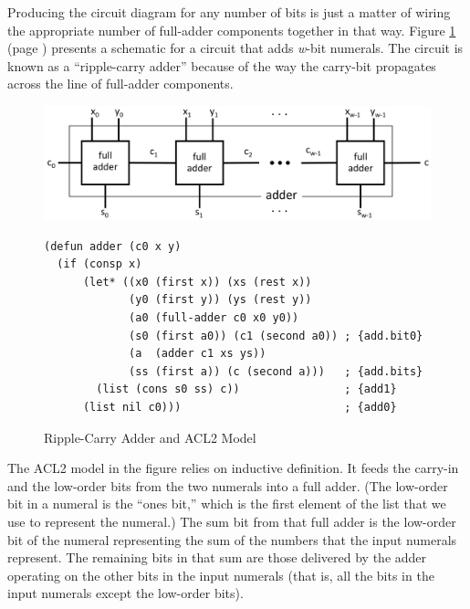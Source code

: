 Producing the circuit diagram for any number of bits
is just a matter of wiring the appropriate number of
full-adder components together in that way.
Figure \ref{fig:adder} (page \pageref{fig:adder}) presents a schematic
for a circuit that adds \emph{w}-bit numerals.
The circuit is known as a ``ripple-carry adder'' because
of the way the carry-bit propagates across the line
of full-adder components.

\begin{figure}
\begin{center}
\includegraphics[scale=0.25]{Images/adder.png}
\begin{Verbatim}
(defun adder (c0 x y)
  (if (consp x)
      (let* ((x0 (first x)) (xs (rest x))
             (y0 (first y)) (ys (rest y))
             (a0 (full-adder c0 x0 y0))
             (s0 (first a0)) (c1 (second a0)) ; {add.bit0}
             (a  (adder c1 xs ys))
             (ss (first a)) (c (second a)))   ; {add.bits}
        (list (cons s0 ss) c))                ; {add1}
      (list nil c0)))                         ; {add0}
\end{Verbatim}
\end{center}
\caption{Ripple-Carry Adder and ACL2 Model}
\label{fig:adder}
\end{figure}

The ACL2 model in the figure relies
on inductive definition. It feeds the carry-in and
the low-order bits from the two numerals into a full adder.
(The low-order bit in a numeral is the ``ones bit,''
which is the first element of the list that we use to
represent the numeral.)
The sum bit from that full adder
is the low-order bit of the numeral representing the sum of
the numbers that the input numerals represent.
The remaining bits in that sum are those delivered by
the adder operating on the other bits in the input numerals
(that is, all the bits in the input numerals except the low-order bits).

